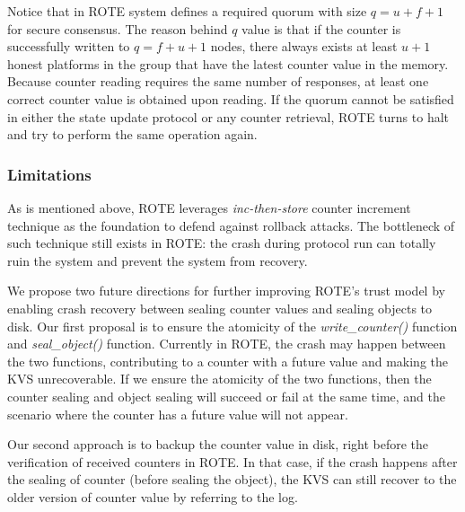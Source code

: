 Notice that in ROTE system defines a required quorum with size $q=u+f+1$ for secure consensus. The reason behind $q$ value is that if the counter is successfully written to $q = f + u + 1$ nodes, there always exists at least $u + 1$ honest platforms in the group that have the latest counter value in the memory. Because counter reading requires the same number of responses, at least one correct counter value is obtained upon reading. If the quorum cannot be satisfied in either the state update protocol or any counter retrieval, ROTE turns to halt and try to perform the same operation again.









\subsubsection{Limitations}

As is mentioned above, ROTE leverages \textit{inc-then-store} counter increment 
technique as the foundation to defend against rollback attacks. The bottleneck 
of such technique still exists in ROTE: the crash during protocol run can totally 
ruin the system and prevent the system from recovery. 

We propose two future directions for further improving ROTE's trust model by enabling 
crash recovery between sealing counter values and sealing objects to disk.
Our first proposal is to ensure the atomicity of the \textit{write\_counter()} function
and \textit{seal\_object()} function. Currently in ROTE, the crash may happen between the 
two functions, contributing to a counter with a future value and making the KVS unrecoverable.
If we ensure the atomicity of the two functions, then the counter sealing and object sealing 
will succeed or fail at the same time, and the scenario where the counter has a future value 
will not appear.

Our second approach is to backup the counter value in disk, right before the verification 
of received counters in ROTE. In that case, if the crash happens after the sealing of counter
(before sealing the object), the KVS can still recover to the older version of counter value 
by referring to the log.
